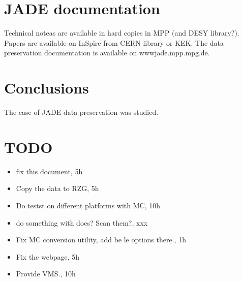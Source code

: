 \section{JADE documentation}
Technical noteas are available in hard copies in MPP (and DESY library?).
Papers are available on InSpire from CERN library or KEK.
The data preservation documentation is available on wwwjade.mpp.mpg.de.

\section{Conclusions}
The case of JADE data preservation was studied.

\section{TODO}
\begin{itemize}
\item fix this document, 5h
\item Copy the data to RZG, 5h
\item Do testst on different platforms with MC, 10h
\item do something with docs? Scan them?, xxx
\item Fix MC conversion utility, add be le options there., 1h
\item Fix the webpage, 5h
\item Provide VMS., 10h
\end{itemize}



